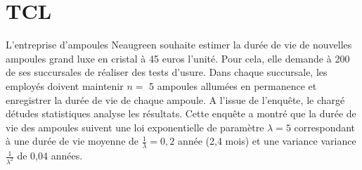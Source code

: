 \documentclass[12pt,paper=a4,answers]{exam}
\begin{document}
 \section{TCL}
 L'entreprise d'ampoules Neaugreen  souhaite estimer la dur\'ee de vie de nouvelles ampoules grand luxe en cristal \`a 45 euros l'unit\'e. Pour cela, elle demande \`a 200 de ses succursales de r\'ealiser des tests d'usure. Dans chaque succursale, les employ\'es doivent maintenir $n =$ 5 ampoules allum\'ees en permanence et enregistrer la dur\'ee de vie de chaque ampoule. A l'issue de l'enqu\^ete, le charg\'e d\'etudes statistiques analyse  les r\'esultats. Cette enqu\^ete a montr\'e que la dur\'ee de vie des ampoules suivent une  loi exponentielle de param\`etre $\lambda = 5$ correspondant à une dur\'ee de vie moyenne de $\frac{1}{\lambda } = 0,2$ ann\'ee (2,4 mois) et une variance variance $\frac{1}{\lambda ^2}$ de 0,04 ann\'ees. 
\end{document}
